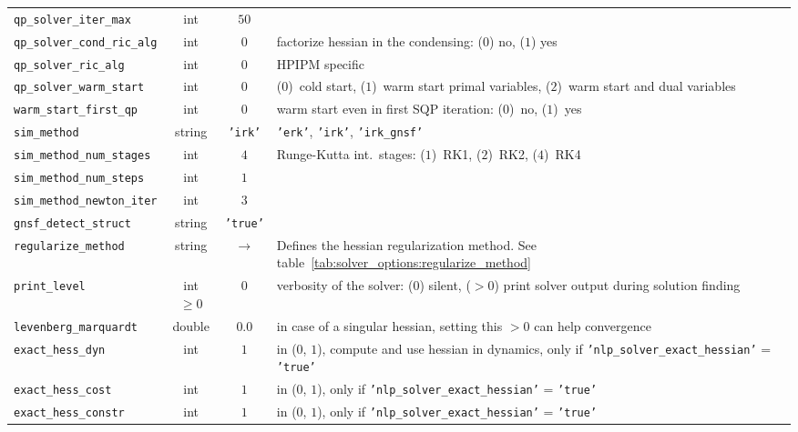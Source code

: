 \documentclass[english]{article}
\newcommand{\code}[1]{\texttt{#1}}
\newcommand{\str}[1]{\texttt{'#1'}}
\begin{document}
\begin{table}
\begin{tabulary}{\textwidth}{p{4cm}@{}C@{}C@{}p{10cm}}
        \code{qp\_solver\_iter\_max} & int & $50$\\
        \code{qp\_solver\_cond\_ric\_alg} & int & $0$ & factorize hessian in the condensing: ($0$) no, ($1$) yes \\
        \code{qp\_solver\_ric\_alg} & int & $0$ & HPIPM specific \\
        \code{qp\_solver\_warm\_start} & int & $0$ & ($0$)~cold start, ($1$)~warm start primal variables, ($2$)~warm start and dual variables \\
        \code{warm\_start\_first\_qp} & int & $0$ & warm start even in first SQP iteration: ($0$)~no, ($1$)~yes \\
        \code{sim\_method} & string & \str{irk} & \str{erk}, \str{irk}, \str{irk\_gnsf} \\
        \code{sim\_method\_num\_stages} & int & $4$ & Runge-Kutta int.\ stages: ($1$)~RK1, ($2$)~RK2, ($4$)~RK4\\
        \code{sim\_method\_num\_steps} & int & $1$\\
        \code{sim\_method\_newton\_iter} & int & $3$\\
        \code{gnsf\_detect\_struct} & string & \str{true}\\
        \code{regularize\_method} & string & $\longrightarrow$ & Defines the hessian regularization method. See table~\ref{tab:solver_options:regularize_method}\\
        \code{print\_level} & int $\geq 0$ & $0$ & verbosity of the solver: ($0$) silent, ($>0$) print solver output during solution finding \\
        \code{levenberg\_marquardt} & double & $0.0$ & in case of a singular hessian, setting this $>0$ can help convergence \\
        \code{exact\_hess\_dyn} & int & $1$ & in ($0$, $1$), compute and use hessian in dynamics, only if \str{nlp\_\-solver\_\-exact\_\-hessian} = \str{true} \\
        \code{exact\_hess\_cost} & int & $1$ & in ($0$, $1$), only if \str{nlp\_solver\_exact\_hessian} = \str{true} \\
        \code{exact\_hess\_constr} & int & $1$ & in ($0$, $1$), only if \str{nlp\_solver\_exact\_hessian} = \str{true} \\
        \bottomrule
    \end{tabulary}
\end{table}
\end{document}
